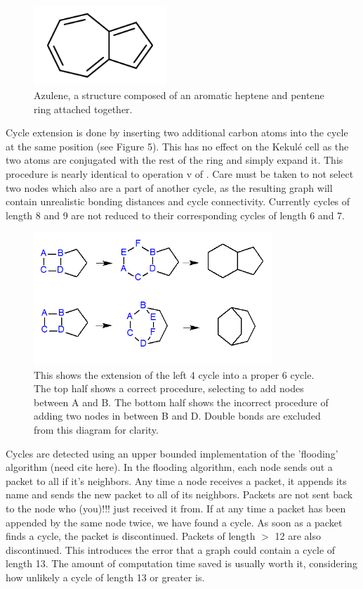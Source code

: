 \documentclass[12pt]{article}
\begin{document}
\begin{figure}[ht!]
\centering
\includegraphics[width=50mm]{azulene.png}
\caption{Azulene, a structure composed of an aromatic heptene and pentene ring attached together.}
\end{figure}

Cycle extension is done by inserting two additional carbon atoms into the cycle at the same position (see Figure 5). This has no effect on the Kekul\'e cell as the two atoms are conjugated with the rest of the ring and simply expand it. This procedure is nearly identical to operation v of \cite{v06}. Care must be taken to not select two nodes which also are a part of another cycle, as the resulting graph will contain unrealistic bonding distances and cycle connectivity. Currently cycles of length 8 and 9 are not reduced to their corresponding cycles of length 6 and 7. 

\begin{figure}[ht!]
\centering
\includegraphics[width=90mm]{cycleExtension.png}
\caption{This shows the extension of the left 4 cycle into a proper 6 cycle. The top half shows a correct procedure, selecting to add nodes between A and B. The bottom half shows the incorrect procedure of adding two nodes in between B and D. Double bonds are excluded from this diagram for clarity.}
\end{figure}

Cycles are detected using an upper bounded implementation of the 'flooding' algorithm (need cite here). In the flooding algorithm, each node sends out a packet to all if it's neighbors. Any time a node receives a packet, it appends its name and sends the new packet to all of its neighbors. Packets are not sent back to the node who (you)!!! just received it from. If at any time a packet has been appended by the same node twice, we have found a cycle. As soon as a packet finds a cycle, the packet is discontinued. Packets of length $>$ 12 are also discontinued. This introduces the error that a graph could contain a cycle of length 13. The amount of computation time saved is usually worth it, considering how unlikely a cycle of length 13 or greater is. 
\end{document}
